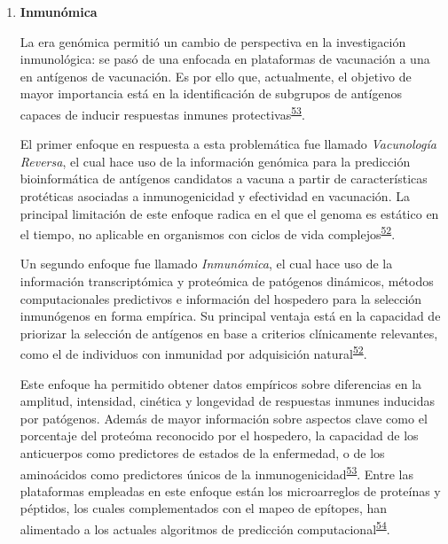 \documentclass[]{article}
\begin{document}
\begin{enumerate}
  \begin{enumerate}
  \def\labelenumii{\roman{enumii}.}
  \item
    \textbf{Inmunómica}

    La era genómica permitió un cambio de perspectiva en la
    investigación inmunológica: se pasó de una enfocada en plataformas
    de vacunación a una en antígenos de vacunación. Es por ello que,
    actualmente, el objetivo de mayor importancia está en la
    identificación de subgrupos de antígenos capaces de inducir
    respuestas inmunes
    protectivas\textsuperscript{\protect\hyperlink{ref-Davies2015Large}{53}}.

    El primer enfoque en respuesta a esta problemática fue llamado
    \emph{Vacunología Reversa}, el cual hace uso de la información
    genómica para la predicción bioinformática de antígenos candidatos a
    vacuna a partir de características protéticas asociadas a
    inmunogenicidad y efectividad en vacunación. La principal limitación
    de este enfoque radica en el que el genoma es estático en el tiempo,
    no aplicable en organismos con ciclos de vida
    complejos\textsuperscript{\protect\hyperlink{ref-immunomics2016}{52}}.

    Un segundo enfoque fue llamado \emph{Inmunómica}, el cual hace uso
    de la información transcriptómica y proteómica de patógenos
    dinámicos, métodos computacionales predictivos e información del
    hospedero para la selección inmunógenos en forma empírica. Su
    principal ventaja está en la capacidad de priorizar la selección de
    antígenos en base a criterios clínicamente relevantes, como el de
    individuos con inmunidad por adquisición
    natural\textsuperscript{\protect\hyperlink{ref-immunomics2016}{52}}.

    Este enfoque ha permitido obtener datos empíricos sobre diferencias
    en la amplitud, intensidad, cinética y longevidad de respuestas
    inmunes inducidas por patógenos. Además de mayor información sobre
    aspectos clave como el porcentaje del proteóma reconocido por el
    hospedero, la capacidad de los anticuerpos como predictores de
    estados de la enfermedad, o de los aminoácidos como predictores
    únicos de la
    inmunogenicidad\textsuperscript{\protect\hyperlink{ref-Davies2015Large}{53}}.
    Entre las plataformas empleadas en este enfoque están los
    microarreglos de proteínas y péptidos, los cuales complementados con
    el mapeo de epítopes, han alimentado a los actuales algoritmos de
    predicción
    computacional\textsuperscript{\protect\hyperlink{ref-carmona2015peptide}{54}}.
  \end{enumerate}
\end{enumerate}
\end{document}
